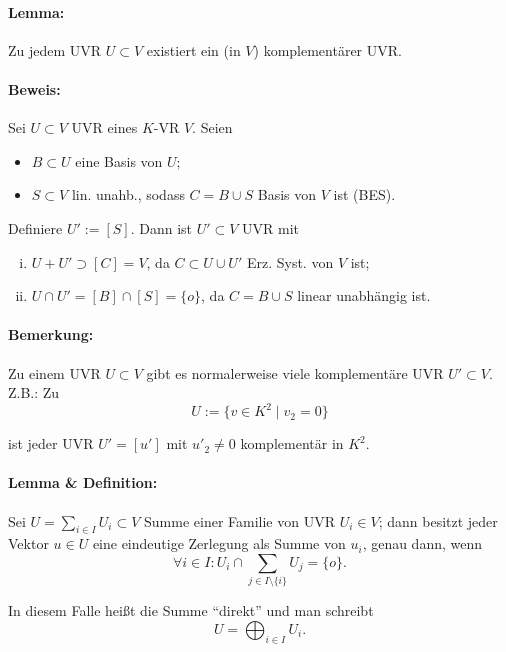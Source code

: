 \paragraph{Lemma: }
	Zu jedem UVR $ U\subset V $ existiert ein (in $ V $) komplementärer UVR.
	
\paragraph{Beweis: }
	Sei $ U\subset V $ UVR eines $ K $-VR $ V $.
	Seien 
		\begin{itemize}
		\item $ B\subset U $ eine Basis von $ U $;
		\item $ S\subset V $ lin. unahb., sodass $ C=B\cup S $ Basis von $ V $ ist (BES).
		\end{itemize}
	
	Definiere $ U':= [S] $. Dann ist $ U'\subset V $ UVR mit
		\begin{enumerate}[(i)]
		\item $ U+U' \supset [C] = V $, da $ C\subset U\cup U' $ Erz. Syst. von $ V $ ist;
		\item $ U\cap U' = [B]\cap [S] = \{o\}$, da $ C=B\cup S $ linear unabhängig ist.
		\end{enumerate}
\paragraph{Bemerkung: }
	Zu einem UVR $ U\subset V $ gibt es normalerweise viele komplementäre UVR $ U'\subset V $.
	Z.B.: Zu
		\begin{equation*}
		U:= \{v\in K^2\mid v_2 = 0\}
		\end{equation*}
	
	ist jeder UVR $ U' = [u']$ mit $u'_2\neq 0 $ komplementär in $ K^2 $.
	
\paragraph{Lemma \& Definition: }
	Sei $ U= \sum_{i\in I}U_i\subset V $ Summe einer Familie von UVR $ U_i\in V $; dann besitzt jeder Vektor $ u\in U $ eine eindeutige Zerlegung als Summe von $ u_i $, genau dann, wenn
		\begin{equation*}
		\forall i\in I: U_i\cap \sum_{j\in I\setminus \{i\}}U_j = \{o\}.
		\end{equation*}
		
	In diesem Falle heißt die Summe "`direkt"' und man schreibt
	\[ U = \bigoplus_{i\in I} U_i. \]
		
